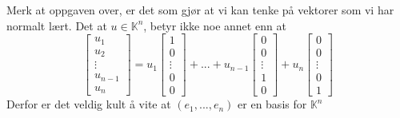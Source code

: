 \documentclass[a4paper,norsk]{article}
\begin{document}
Merk at oppgaven over, er det som gjør at vi kan tenke på vektorer som vi har normalt lært. Det at $ u \in \mathbb{K}^n $, betyr ikke noe annet enn at 
\[
    \begin{bmatrix}
        u_1\\ u_2 \\ \vdots\\u_{n-1} \\ u_n
    \end{bmatrix}  = u_1 \begin{bmatrix}
        1\\ 0\\ \vdots\\0\\0
    \end{bmatrix} + ... + u_{n-1} \begin{bmatrix}
       0 \\ 0\\ \vdots\\1\\0
    \end{bmatrix} + u_n \begin{bmatrix}
       0 \\ 0\\ \vdots\\0\\1
    \end{bmatrix}
\]
Derfor er det veldig kult å vite at $ \left( e_1, ..., e_n \right)  $ er en basis for $ \mathbb{K}^n $ 
\end{document}
